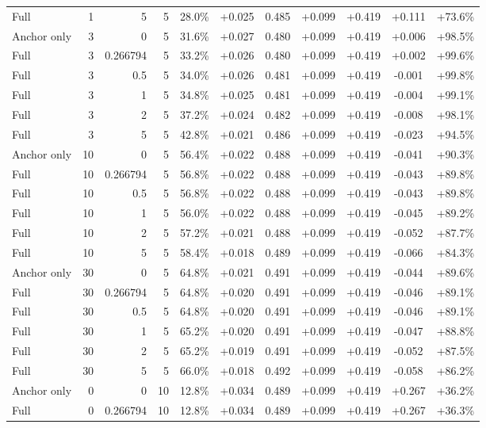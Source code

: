 \begin{table}[htbp]
\begin{tabular}{lrrrccccccc}
Full & 1 & 5 & 5 & 28.0\% & +0.025 & 0.485 & +0.099 & +0.419 & +0.111 & +73.6\% \\
Anchor only & 3 & 0 & 5 & 31.6\% & +0.027 & 0.480 & +0.099 & +0.419 & +0.006 & +98.5\% \\
Full & 3 & 0.266794 & 5 & 33.2\% & +0.026 & 0.480 & +0.099 & +0.419 & +0.002 & +99.6\% \\
Full & 3 & 0.5 & 5 & 34.0\% & +0.026 & 0.481 & +0.099 & +0.419 & -0.001 & +99.8\% \\
Full & 3 & 1 & 5 & 34.8\% & +0.025 & 0.481 & +0.099 & +0.419 & -0.004 & +99.1\% \\
Full & 3 & 2 & 5 & 37.2\% & +0.024 & 0.482 & +0.099 & +0.419 & -0.008 & +98.1\% \\
Full & 3 & 5 & 5 & 42.8\% & +0.021 & 0.486 & +0.099 & +0.419 & -0.023 & +94.5\% \\
Anchor only & 10 & 0 & 5 & 56.4\% & +0.022 & 0.488 & +0.099 & +0.419 & -0.041 & +90.3\% \\
Full & 10 & 0.266794 & 5 & 56.8\% & +0.022 & 0.488 & +0.099 & +0.419 & -0.043 & +89.8\% \\
Full & 10 & 0.5 & 5 & 56.8\% & +0.022 & 0.488 & +0.099 & +0.419 & -0.043 & +89.8\% \\
Full & 10 & 1 & 5 & 56.0\% & +0.022 & 0.488 & +0.099 & +0.419 & -0.045 & +89.2\% \\
Full & 10 & 2 & 5 & 57.2\% & +0.021 & 0.488 & +0.099 & +0.419 & -0.052 & +87.7\% \\
Full & 10 & 5 & 5 & 58.4\% & +0.018 & 0.489 & +0.099 & +0.419 & -0.066 & +84.3\% \\
Anchor only & 30 & 0 & 5 & 64.8\% & +0.021 & 0.491 & +0.099 & +0.419 & -0.044 & +89.6\% \\
Full & 30 & 0.266794 & 5 & 64.8\% & +0.020 & 0.491 & +0.099 & +0.419 & -0.046 & +89.1\% \\
Full & 30 & 0.5 & 5 & 64.8\% & +0.020 & 0.491 & +0.099 & +0.419 & -0.046 & +89.1\% \\
Full & 30 & 1 & 5 & 65.2\% & +0.020 & 0.491 & +0.099 & +0.419 & -0.047 & +88.8\% \\
Full & 30 & 2 & 5 & 65.2\% & +0.019 & 0.491 & +0.099 & +0.419 & -0.052 & +87.5\% \\
Full & 30 & 5 & 5 & 66.0\% & +0.018 & 0.492 & +0.099 & +0.419 & -0.058 & +86.2\% \\
Anchor only & 0 & 0 & 10 & 12.8\% & +0.034 & 0.489 & +0.099 & +0.419 & +0.267 & +36.2\% \\
Full & 0 & 0.266794 & 10 & 12.8\% & +0.034 & 0.489 & +0.099 & +0.419 & +0.267 & +36.3\% \\

\end{tabular}
\end{table}
